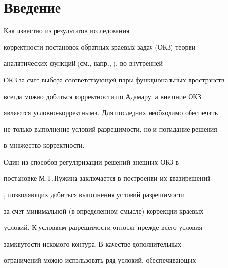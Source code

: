 \date{}




\pagestyle{plain} %







\maketitle


\label{begin}








\section*{Введение}





Как известно из результатов исследования


корректности постановок обратных краевых задач (ОКЗ) теории


аналитических функций (см., напр., \cite{Gur}), во внутренней


ОКЗ за счет выбора соответствующей пары функциональных пространств


всегда можно добиться корректности по Адамару, а внешние ОКЗ


являются условно-корректными. Для последних необходимо обеспечить


не только выполнение условий разрешимости, но и попадание решения


в множество корректности.





Один из способов регуляризации решений внешних ОКЗ в


постановке М.Т.\,Ну\-жи\-на заключается в построении их квазирешений


\cite{Eliz1}, позволяющих добиться выполнения условий разрешимости


за счет минимальной (в определенном смысле) коррекции краевых


условий. К условиям разрешимости относят прежде всего условия


замкнутости искомого контура. В качестве дополнительных


ограничений можно использовать ряд условий, обеспечивающих


